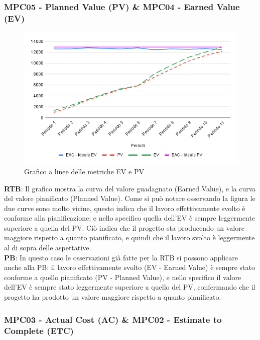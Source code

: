 \documentclass[10pt]{article}
\begin{document}
\begin{justify}
\subsubsection{MPC05 - Planned Value (PV) \& MPC04 - Earned Value (EV)}

\begin{figure}[H]
  \centering
  \includegraphics[width=0.9\linewidth]{EV-PV.png}
  \caption{Grafico a linee delle metriche EV e PV}
  \label{fig:EV-PVchart}
\end{figure}

\textbf{RTB}: Il grafico mostra la curva del valore guadagnato (Earned Value), e la curva del valore pianificato (Planned Value). Come si può notare osservando la 
figura le due curve sono molto vicine, questo indica che il lavoro effettivamente svolto è conforme alla pianificazione; e nello specifico quella dell'EV è sempre 
leggermente superiore a quella del PV. Ciò indica che il progetto sta producendo un valore maggiore rispetto a quanto pianificato, e quindi che il lavoro svolto 
è leggermente al di sopra delle aspettative.\\

\noindent
\textbf{PB}: In questo caso le osservazioni già fatte per la RTB si possono applicare anche alla PB: il lavoro effettivamente svolto (EV - Earned Value) è sempre stato 
conforme a quello pianificato (PV - Planned Value), e nello specifico il valore dell'EV è sempre stato leggermente superiore a quello del PV, confermando che il 
progetto ha prodotto un valore maggiore rispetto a quanto pianificato.\\



\subsubsection{MPC03 - Actual Cost (AC) \& MPC02 - Estimate to Complete (ETC)}


\end{justify}
\end{document}
